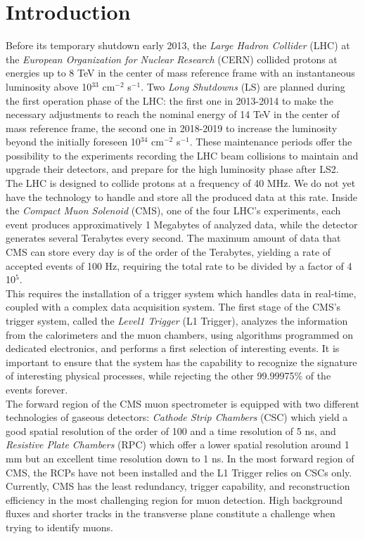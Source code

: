 \chapter*[Introduction]{Introduction}
\label{chap:introduction}

	Before its temporary shutdown early 2013, the \emph{Large Hadron Collider} (LHC) at the \emph{European Organization for Nuclear Research} (CERN) collided protons at energies up to 8 TeV in the center of mass reference frame with an instantaneous luminosity above 10$ ^{33} $ cm$ ^{-2} $ s$ ^{-1} $. Two \emph{Long Shutdowns} (LS) are planned during the first operation phase of the LHC: the first one in 2013-2014 to make the necessary adjustments to reach the nominal energy of 14 TeV in the center of mass reference frame, the second one in 2018-2019 to increase the luminosity beyond the initially foreseen 10$ ^{34} $ cm$ ^{-2} $ s$ ^{-1} $. These maintenance periods offer the possibility to the experiments recording the LHC beam collisions to maintain and upgrade their detectors, and prepare for the high luminosity phase after LS2. \\

	The LHC is designed to collide protons at a frequency of 40 MHz. We do not yet have the technology to handle and store all the produced data at this rate. Inside the \emph{Compact Muon Solenoid} (CMS), one of the four LHC's experiments, each event produces approximatively 1 Megabytes of analyzed data, while the detector generates several Terabytes every second. The maximum amount of data that CMS can store every day is of the order of the Terabytes, yielding a rate of accepted events of 100 Hz, requiring the total rate to be divided by a factor of 4 10$ ^{5} $. \\

	This requires the installation of a trigger system which handles data in real-time, coupled with a complex data acquisition system. The first stage of the CMS's trigger system, called the \emph{Level1 Trigger} (L1 Trigger), analyzes the information from the calorimeters and the muon chambers, using algorithms programmed on dedicated electronics, and performs a first selection of interesting events. It is important to ensure that the system has the capability to recognize the signature of interesting physical processes, while rejecting the other 99.99975\% of the events forever. \\

	The forward region of the CMS muon spectrometer is equipped with two different technologies of gaseous detectors: \emph{Cathode Strip Chambers} (CSC) which yield a good spatial resolution of the order of 100 \um{} and a time resolution of 5 ns, and \emph{Resistive Plate Chambers} (RPC) which offer a lower spatial resolution around 1 mm but an excellent time resolution down to 1 ns. In the most forward region of CMS, the RCPs have not been installed and the L1 Trigger relies on CSCs only. Currently, CMS has the least redundancy, trigger capability, and reconstruction efficiency in the most challenging region for muon detection. High background fluxes and shorter tracks in the transverse plane constitute a challenge when trying to identify muons. \\

